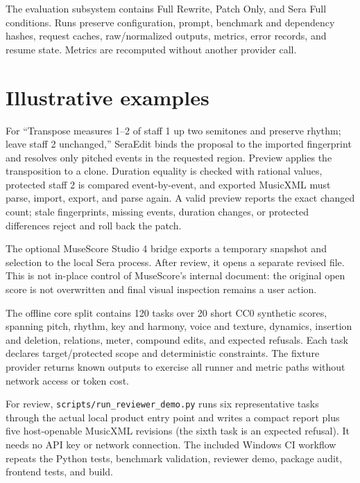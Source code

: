 \documentclass[preprint,12pt,a4paper]{elsarticle}
\begin{document}
The evaluation subsystem contains Full Rewrite, Patch Only, and Sera Full conditions.
Runs preserve configuration, prompt, benchmark and
dependency hashes, request caches, raw/normalized outputs, metrics, error records, and
resume state. Metrics are recomputed without another provider call.

\section{Illustrative examples}

For “Transpose measures 1--2 of staff 1 up two semitones and preserve rhythm; leave
staff 2 unchanged,” SeraEdit binds the proposal to the imported fingerprint and resolves
only pitched events in the requested region. Preview applies the transposition to a
clone. Duration equality is checked with rational values, protected staff 2 is compared
event-by-event, and exported MusicXML must parse, import, export, and parse again. A
valid preview reports the exact changed count; stale fingerprints, missing events,
duration changes, or protected differences reject and roll back the patch.

The optional MuseScore Studio 4 bridge exports a temporary snapshot and selection to
the local Sera process. After review, it opens a separate revised file. This is not
in-place control of MuseScore's internal document: the original open score is not
overwritten and final visual inspection remains a user action.

The offline core split contains 120 tasks over 20 short CC0 synthetic scores, spanning
pitch, rhythm, key and harmony, voice and texture, dynamics, insertion and deletion, relations,
meter, compound edits, and expected refusals. Each task declares target/protected scope
and deterministic constraints. The fixture provider returns known outputs to exercise
all runner and metric paths without network access or token cost.

For review, \texttt{scripts/run\_reviewer\_demo.py} runs six representative tasks
through the actual local product entry point and writes a compact report plus five
host-openable MusicXML revisions (the sixth task is an expected refusal). It needs no
API key or network connection. The included Windows CI workflow repeats the Python
tests, benchmark validation, reviewer demo, package audit, frontend tests, and build.
\end{document}

